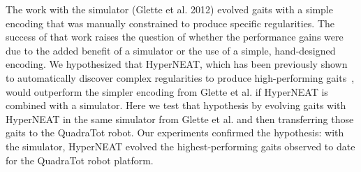 The work with the simulator (Glette et al. 2012) evolved gaits with a simple encoding that was manually constrained to produce specific regularities. The success of that work raises the question of whether the performance gains were due to the added benefit of a simulator or the use of a simple, hand-designed encoding. We hypothesized that HyperNEAT, which has been previously shown to automatically discover complex regularities to produce high-performing gaits~\cite{clune2011performance,yos:clune}, would outperform the simpler encoding from Glette et al. if HyperNEAT is combined with a simulator. 
Here we test that hypothesis by evolving gaits with HyperNEAT in the same simulator from Glette et al. and then transferring those gaits to the QuadraTot robot.  Our experiments confirmed the hypothesis: with the simulator, HyperNEAT evolved the highest-performing gaits observed to date for the QuadraTot robot platform. 




